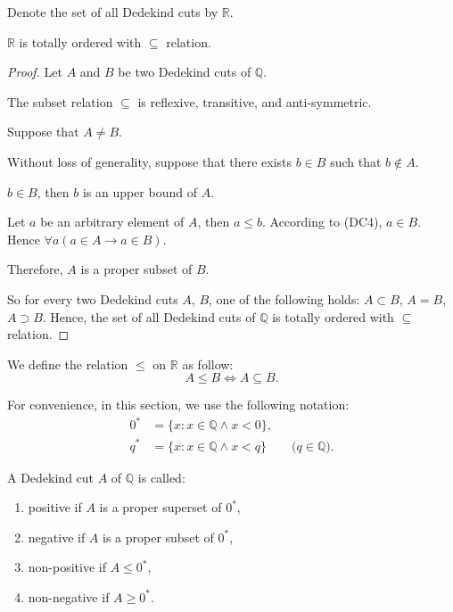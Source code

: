 Denote the set of all Dedekind cuts by $\mathbb{R}$.

\begin{theorem}
    $\mathbb{R}$ is totally ordered with $\subseteq$ relation.
\end{theorem}

\begin{proof}
    Let $A$ and $B$ be two Dedekind cuts of $\mathbb{Q}$.

    The subset relation $\subseteq$ is reflexive, transitive, and anti-symmetric.
    \bigskip

    Suppose that $A\ne B$.

    Without loss of generality, suppose that there exists $b\in B$ such that $b\notin A$.

    $b\in B$, then $b$ is an upper bound of $A$.

    Let $a$ be an arbitrary element of $A$, then $a\le b$. According to (DC4), $a\in B$. Hence $\forall a(a\in A\rightarrow a\in B)$.

    Therefore, $A$ is a proper subset of $B$.
    \bigskip

    So for every two Dedekind cuts $A$, $B$, one of the following holds: $A\subset B$, $A = B$, $A\supset B$. Hence, the set of all Dedekind cuts of $\mathbb{Q}$ is totally ordered with $\subseteq$ relation.
\end{proof}

We define the relation $\le$ on $\mathbb{R}$ as follow:
\[
    A\le B \Longleftrightarrow A\subseteq B.
\]

For convenience, in this section, we use the following notation:
\[
    \begin{split}
        {0}^{*} & = \{ x : x\in\mathbb{Q} \land x < 0 \}, \\
        {q}^{*} & = \{ x : x\in\mathbb{Q} \land x < q \}\qquad\text{($q\in\mathbb{Q}$)}.
    \end{split}
\]

\begin{definition}
    A Dedekind cut $A$ of $\mathbb{Q}$ is called:
    \begin{enumerate}[label={(\roman*)},itemsep=0pt]
        \item positive if $A$ is a proper superset of ${0}^{*}$,
        \item negative if $A$ is a proper subset of ${0}^{*}$,
        \item non-positive if $A\le {0}^{*}$,
        \item non-negative if $A\ge {0}^{*}$.
    \end{enumerate}
\end{definition}

